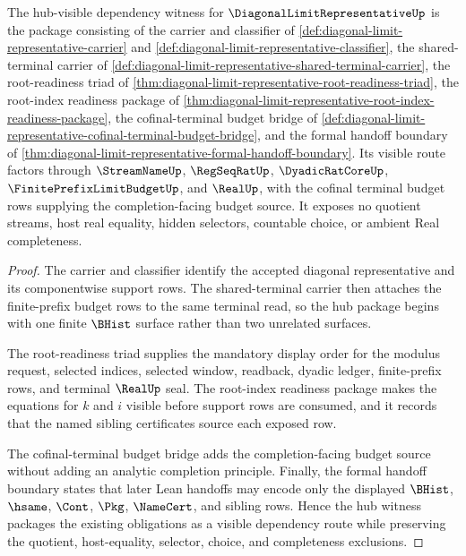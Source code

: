 \begin{theorem}
\label{thm:diagonal-limit-representative-hub-dependency-witness}
The hub-visible dependency witness for $\DiagonalLimitRepresentativeUp$ is the package consisting of the carrier and classifier of \autoref{def:diagonal-limit-representative-carrier} and \autoref{def:diagonal-limit-representative-classifier}, the shared-terminal carrier of \autoref{def:diagonal-limit-representative-shared-terminal-carrier}, the root-readiness triad of \autoref{thm:diagonal-limit-representative-root-readiness-triad}, the root-index readiness package of \autoref{thm:diagonal-limit-representative-root-index-readiness-package}, the cofinal-terminal budget bridge of \autoref{def:diagonal-limit-representative-cofinal-terminal-budget-bridge}, and the formal handoff boundary of \autoref{thm:diagonal-limit-representative-formal-handoff-boundary}. Its visible route factors through $\StreamNameUp$, $\RegSeqRatUp$, $\DyadicRatCoreUp$, $\FinitePrefixLimitBudgetUp$, and $\RealUp$, with the cofinal terminal budget rows supplying the completion-facing budget source. It exposes no quotient streams, host real equality, hidden selectors, countable choice, or ambient Real completeness.
\end{theorem}
\begin{proof}
The carrier and classifier identify the accepted diagonal representative and its componentwise support rows. The shared-terminal carrier then attaches the finite-prefix budget rows to the same terminal read, so the hub package begins with one finite $\BHist$ surface rather than two unrelated surfaces.

The root-readiness triad supplies the mandatory display order for the modulus request, selected indices, selected window, readback, dyadic ledger, finite-prefix rows, and terminal $\RealUp$ seal. The root-index readiness package makes the equations for $k$ and $i$ visible before support rows are consumed, and it records that the named sibling certificates source each exposed row.

The cofinal-terminal budget bridge adds the completion-facing budget source without adding an analytic completion principle. Finally, the formal handoff boundary states that later Lean handoffs may encode only the displayed $\BHist$, $\hsame$, $\Cont$, $\Pkg$, $\NameCert$, and sibling rows. Hence the hub witness packages the existing obligations as a visible dependency route while preserving the quotient, host-equality, selector, choice, and completeness exclusions.
\end{proof}

